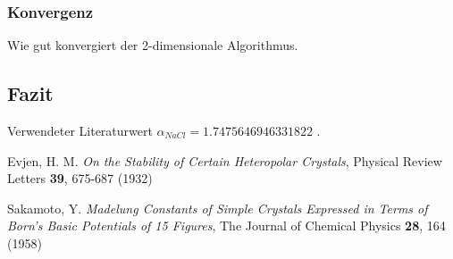 \documentclass[10pt,a4paper]{article}
\begin{document}
\subsubsection{Konvergenz}

Wie gut konvergiert der 2-dimensionale Algorithmus.

\subsection{Fazit}

Verwendeter Literaturwert $\alpha_{NaCl} = 1.7475646946331822$ \cite{Sakamoto} .


\begin{thebibliography}{9}

Evjen, H. M.
\emph{On the Stability of Certain Heteropolar Crystals},
Physical Review Letters \textbf{39},
675-687 (1932)

Sakamoto, Y.
\emph{Madelung Constants of Simple Crystals Expressed in Terms of Born's Basic
Potentials of 15 Figures},
The Journal of Chemical Physics \textbf{28},
164 (1958)

\end{thebibliography}
\end{document}
